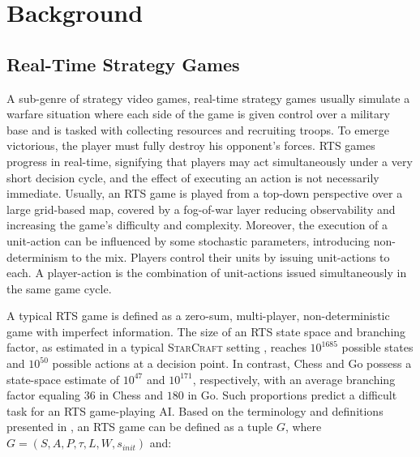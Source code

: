 \documentclass[conference]{IEEEtran}
\begin{document}

\section{Background}
\label{sec:background}

\subsection{Real-Time Strategy Games}

A sub-genre of strategy video games, real-time strategy games usually simulate a warfare situation where each side of the game is given control over a military base and is tasked with collecting resources and recruiting troops.
 To emerge victorious, the player must fully destroy his opponent's forces. RTS games progress in real-time, signifying that players may act simultaneously under a very short decision cycle, and the effect of executing an action is not necessarily immediate. Usually, an RTS game is played from a top-down perspective over a large grid-based map, covered by a fog-of-war layer reducing observability and increasing the game's difficulty and complexity. Moreover, the execution of a unit-action can be influenced by some stochastic parameters,
 introducing non-determinism to the mix. Players control their units by issuing unit-actions to each. A player-action is the combination of unit-actions issued simultaneously in the same game cycle.
 

A typical RTS game is defined as a zero-sum, multi-player, non-deterministic game with imperfect information. The size of an RTS state space and branching factor, as estimated in a typical \textsc{StarCraft} setting \cite{ontanon_survey_2013}, reaches $10^{1685}$ possible states and $10^{50}$ possible actions at a decision point. In contrast, Chess and Go possess a state-space estimate of $10^{47}$ and $10^{171}$, respectively, with an average branching factor equaling $36$ in Chess and $180$ in Go. Such proportions predict a difficult task for an RTS game-playing AI. Based on the terminology and definitions presented in \cite{ontanon_combinatorial_2017}, an RTS game can be defined as a tuple $G$, where $G = (S, A, P, \tau, L, W, s_{init})$ and:
\end{document}
